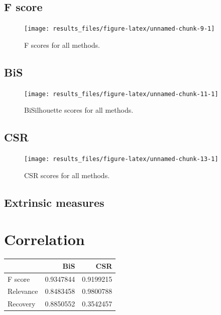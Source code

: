 \documentclass[
]{article}
\begin{document}
\hypertarget{f-score}{%
\subsection{F score}\label{f-score}}

\begin{figure}[H]

{\centering \texttt{[image: results\_files/figure-latex/unnamed-chunk-9-1]} 

}

\caption{F scores for all methods.}\label{fig:unnamed-chunk-9}
\end{figure}

\hypertarget{bis}{%
\subsection{BiS}\label{bis}}

\begin{figure}[H]

{\centering \texttt{[image: results\_files/figure-latex/unnamed-chunk-11-1]} 

}

\caption{BiSilhouette scores for all methods.}\label{fig:unnamed-chunk-11}
\end{figure}

\hypertarget{csr}{%
\subsection{CSR}\label{csr}}

\begin{figure}[H]

{\centering \texttt{[image: results\_files/figure-latex/unnamed-chunk-13-1]} 

}

\caption{CSR scores for all methods.}\label{fig:unnamed-chunk-13}
\end{figure}

\hypertarget{extrinsic-measures}{%
\subsection{Extrinsic measures}\label{extrinsic-measures}}

\hypertarget{correlation}{%
\section{Correlation}\label{correlation}}

\begin{tabular}[t]{lrr}
\toprule
  & BiS & CSR\\
\midrule
F score & 0.9347844 & 0.9199215\\
Relevance & 0.8483458 & 0.9800788\\
Recovery & 0.8850552 & 0.3542457\\
\bottomrule
\end{tabular}
\end{document}
